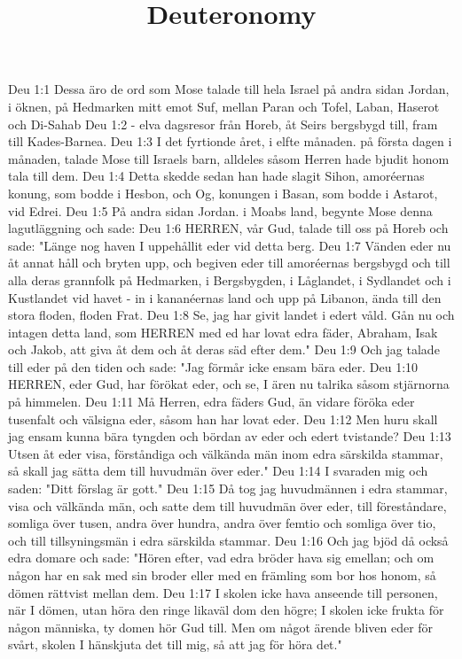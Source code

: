 

\title{Deuteronomy}

Deu 1:1  Dessa äro de ord som Mose talade till hela Israel på andra sidan Jordan, i öknen, på Hedmarken mitt emot Suf, mellan Paran och Tofel, Laban, Haserot och Di-Sahab
Deu 1:2  - elva dagsresor från Horeb, åt Seirs bergsbygd till, fram till Kades-Barnea.
Deu 1:3  I det fyrtionde året, i elfte månaden. på första dagen i månaden, talade Mose till Israels barn, alldeles såsom Herren hade bjudit honom tala till dem.
Deu 1:4  Detta skedde sedan han hade slagit Sihon, amoréernas konung, som bodde i Hesbon, och Og, konungen i Basan, som bodde i Astarot, vid Edrei.
Deu 1:5  På andra sidan Jordan. i Moabs land, begynte Mose denna lagutläggning och sade:
Deu 1:6  HERREN, vår Gud, talade till oss på Horeb och sade: "Länge nog haven I uppehållit eder vid detta berg.
Deu 1:7  Vänden eder nu åt annat håll och bryten upp, och begiven eder till amoréernas bergsbygd och till alla deras grannfolk på Hedmarken, i Bergsbygden, i Låglandet, i Sydlandet och i Kustlandet vid havet - in i kananéernas land och upp på Libanon, ända till den stora floden, floden Frat.
Deu 1:8  Se, jag har givit landet i edert våld. Gån nu och intagen detta land, som HERREN med ed har lovat edra fäder, Abraham, Isak och Jakob, att giva åt dem och åt deras säd efter dem."
Deu 1:9  Och jag talade till eder på den tiden och sade: "Jag förmår icke ensam bära eder.
Deu 1:10  HERREN, eder Gud, har förökat eder, och se, I ären nu talrika såsom stjärnorna på himmelen.
Deu 1:11  Må Herren, edra fäders Gud, än vidare föröka eder tusenfalt och välsigna eder, såsom han har lovat eder.
Deu 1:12  Men huru skall jag ensam kunna bära tyngden och bördan av eder och edert tvistande?
Deu 1:13  Utsen åt eder visa, förståndiga och välkända män inom edra särskilda stammar, så skall jag sätta dem till huvudmän över eder."
Deu 1:14  I svaraden mig och saden: "Ditt förslag är gott."
Deu 1:15  Då tog jag huvudmännen i edra stammar, visa och välkända män, och satte dem till huvudmän över eder, till föreståndare, somliga över tusen, andra över hundra, andra över femtio och somliga över tio, och till tillsyningsmän i edra särskilda stammar.
Deu 1:16  Och jag bjöd då också edra domare och sade: "Hören efter, vad edra bröder hava sig emellan; och om någon har en sak med sin broder eller med en främling som bor hos honom, så dömen rättvist mellan dem.
Deu 1:17  I skolen icke hava anseende till personen, när I dömen, utan höra den ringe likaväl dom den högre; I skolen icke frukta för någon människa, ty domen hör Gud till. Men om något ärende bliven eder för svårt, skolen I hänskjuta det till mig, så att jag för höra det."
